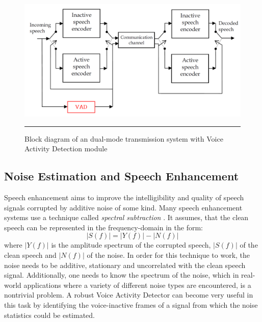 \begin{figure}[htbp]
	\centering
		\includegraphics[width=1\columnwidth]{Figures/DTXVAD.png}
		\rule{37em}{0.5pt}
	\caption[Dual-mode transmission system with Voice Activity Detection module]{Block diagram of an dual-mode transmission system with Voice Activity Detection module \cite{RamirezGorriz}}
	\label{fig:DTXVAD}
\end{figure}

\subsection{Noise Estimation and Speech Enhancement}

Speech enhancement aims to improve the intelligibility and quality of speech signals corrupted by additive  noise of some kind. Many speech enhancement systems use a technique called \emph{spectral subtraction} \cite{Kondoz, RamirezGorriz}. It assumes, that the clean speech can be represented in the frequency-domain in the form:
\begin{equation}
|S(f)| = |Y(f)| - |N(f)|
\end{equation}
where $|Y(f)|$ is the amplitude spectrum of the corrupted speech, $|S(f)|$ of the clean speech and $|N(f)|$ of the noise. In order for this technique to work, the noise needs to be additive, stationary and uncorrelated with the clean speech signal. Additionally, one needs to know the spectrum of the noise, which in real-world applications where a variety of different noise types are encountered, is a nontrivial problem. A robust Voice Activity Detector can become very useful in this task by identifying the voice-inactive frames of a signal from which the noise statistics could be estimated.


